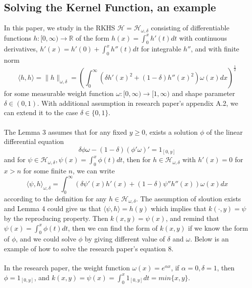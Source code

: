 \subsection{Solving the Kernel Function, an example}
In this paper, we study in the RKHS $\mathcal{H} = \mathcal{H}_{\omega ,\delta}$ consisting of differentiable functions $ h : [0, \infty ) \to \mathbb{R}$ of the form $h(x) = \int_{0}^{x} h'(t) dt$ with continuous derivatives, $h'(x) = h'(0) + \int_{0}^{x} h''(t)dt $ for integrable $h''$, and with finite norm 
\begin{equation}
\langle h, h\rangle = \parallel h \parallel_{\omega ,\delta} = (\int_{0}^{\infty} (\delta h'(x)^2 + (1 - \delta)h''(x)^2)\omega (x)dx)^{\frac{1}{2}}
\end{equation}
for some measurable weight function $\omega : [0, \infty) \to [1, \infty)$ and shape parameter $\delta \in (0,1)$. With additional assumption in research paper's appendix A.2, we can extend it to the case $\delta \in \{ 0, 1\}$. 
\\ \\
The Lemma 3 assumes that for any fixed $y \ge 0$, exists a solution $\phi$ of the linear differential equation 
\begin{equation}
\delta \phi \omega - (1-\delta )(\phi ' \omega)' = 1_{[0,y]}
\end{equation}
and for $\psi  \in \mathcal{H}_{\omega, \delta}, \psi (x) = \int_{0}^{x} \phi (t)dt$, then for $h \in \mathcal{H}_{\omega, \delta}$ with $h'(x) = 0$ for $x > n$ for some finite $n$, we can write 
\begin{equation}
\langle \psi , h\rangle_{\omega, \delta} = \int_{0}^{\infty} (\delta \psi '(x) h'(x) + (1-\delta )\psi '' h''(x))\omega (x)dx
\end{equation}
according to the definition for any $h \in \mathcal{H}_{\omega,\delta}$. The assumption of sloution exists and Lemma 4 could give us that $\langle \psi , h\rangle = h(y)$ which implies that $k(\cdot , y) = \psi$ by the reproducing property. Then  $k(x , y) = \psi (x)$, and remind that $\psi (x) = \int_{0}^{x} \phi (t)dt$, then we can find the form of $k(x,y)$ if we know the form of $\phi$, and we could solve $\phi$ by giving different value of $\delta$ and $\omega$. Below is an example of how to solve the research paper's equation 8. 
\\ \\
In the research paper, the weight function $\omega (x) = e^{\alpha x}$, if $\alpha = 0, \delta = 1$, then $ \phi = 1_{[0,y]}$, and $k(x,y) = \psi (x) = \int_{0}^{x} 1_{[0,y]} dt = min\{x, y\}$. 
